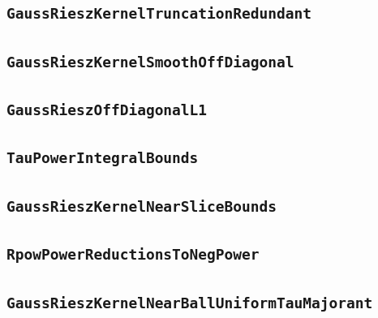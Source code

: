 \documentclass[11pt]{amsart}
\theoremstyle{definition}
\begin{document}
\subsection{\texorpdfstring{\texttt{GaussRieszKernelTruncationRedundant}}{GaussRieszKernelTruncationRedundant}}\label{node:GaussRieszKernelTruncationRedundant}


\subsection{\texorpdfstring{\texttt{GaussRieszKernelSmoothOffDiagonal}}{GaussRieszKernelSmoothOffDiagonal}}\label{node:GaussRieszKernelSmoothOffDiagonal}


\subsection{\texorpdfstring{\texttt{GaussRieszOffDiagonalL1}}{GaussRieszOffDiagonalL1}}\label{node:GaussRieszOffDiagonalL1}


\subsection{\texorpdfstring{\texttt{TauPowerIntegralBounds}}{TauPowerIntegralBounds}}\label{node:TauPowerIntegralBounds}


\subsection{\texorpdfstring{\texttt{GaussRieszKernelNearSliceBounds}}{GaussRieszKernelNearSliceBounds}}\label{node:GaussRieszKernelNearSliceBounds}


\subsection{\texorpdfstring{\texttt{RpowPowerReductionsToNegPower}}{RpowPowerReductionsToNegPower}}\label{node:RpowPowerReductionsToNegPower}


\subsection{\texorpdfstring{\texttt{GaussRieszKernelNearBallUniformTauMajorant}}{GaussRieszKernelNearBallUniformTauMajorant}}\label{node:GaussRieszKernelNearBallUniformTauMajorant}

\end{document}
